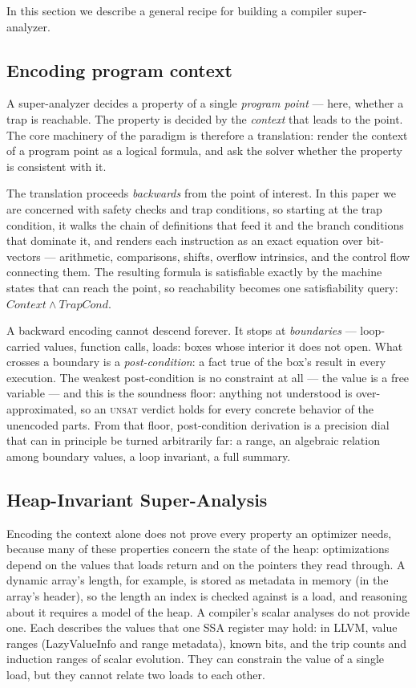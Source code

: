 \documentclass[acmsmall,screen,nonacm]{acmart}
\begin{document}
In this section we describe a general recipe for building a compiler super-analyzer.

\subsection{Encoding program context}
\label{sec:encoding}
A super-analyzer decides a property of a single \emph{program point} ---
here, whether a trap is reachable. The property is decided by
the \emph{context} that leads to the point.
The core machinery of the paradigm is therefore a translation: render
the context of a program point as a logical formula, and ask the solver
whether the property is consistent with it.

The translation proceeds \emph{backwards} from the point of interest.
In this paper we are concerned with safety checks and trap conditions, so starting at the trap condition, it walks the chain of definitions that
feed it and the branch conditions that dominate it, and renders each
instruction as an exact equation over bit-vectors --- arithmetic,
comparisons, shifts, overflow intrinsics, and the control flow
connecting them. The resulting formula is satisfiable exactly by the
machine states that can reach the point, so reachability becomes one
satisfiability query: $\mathit{Context} \wedge \mathit{TrapCond}$.

A backward encoding cannot descend forever. It stops at
\emph{boundaries} --- loop-carried values, function calls, loads:
boxes whose interior it does not open. What crosses a boundary is a
\emph{post-condition}: a fact true of the box's result in every
execution. The weakest post-condition is no constraint at all --- the
value is a free variable --- and this is the soundness floor: anything
not understood is over-approximated, so an \textsc{unsat} verdict holds
for every concrete behavior of the unencoded parts. From that floor,
post-condition derivation is a precision dial that can in principle be
turned arbitrarily far: a range, an algebraic relation among boundary
values, a loop invariant, a full summary. 

\subsection{Heap-Invariant Super-Analysis}
\label{sec:frame}

Encoding the context alone does not prove every property an optimizer
needs, because many of these properties concern the state of the heap:
optimizations depend on the values that loads return and on the
pointers they read through. A dynamic array's length, for example, is
stored as metadata in memory (in the array's header), so the length an
index is checked against is a load, and reasoning about it requires a
model of the heap. A compiler's scalar analyses do not provide one.
Each describes the values that one SSA register may hold: in LLVM,
value ranges (LazyValueInfo and range metadata), known bits, and the
trip counts and induction ranges of scalar evolution. They can
constrain the value of a single load, but they cannot relate two loads
to each other.
\end{document}
